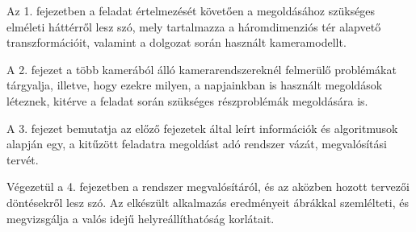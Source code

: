 Az 1. fejezetben a feladat értelmezését követően a megoldásához szükséges elméleti háttérről lesz szó, mely tartalmazza a háromdimenziós tér alapvető transzformációit, valamint a dolgozat során használt kameramodellt.

A 2. fejezet a több kamerából álló kamerarendszereknél felmerülő problémákat tárgyalja, illetve, hogy ezekre milyen, a napjainkban is használt megoldások léteznek, kitérve a feladat során szükséges részproblémák megoldására is.

A 3. fejezet bemutatja az előző fejezetek által leírt információk és algoritmusok alapján egy, a kitűzött feladatra megoldást adó rendszer vázát, megvalósítási tervét. %

Végezetül a 4. fejezetben a rendszer megvalósítáról, és az aközben hozott tervezői döntésekről lesz szó. Az elkészült alkalmazás eredményeit ábrákkal szemlélteti, és megvizsgálja a valós idejű helyreállíthatóság korlátait.